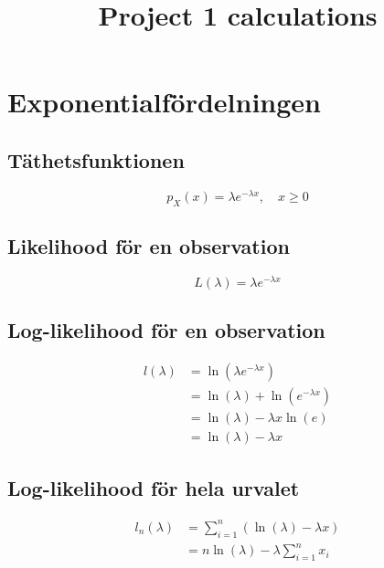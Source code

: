 \documentclass[
]{article}
\title{Project 1 calculations}
\author{}
\date{\vspace{-2.5em}}
\begin{document}
\maketitle

\hypertarget{exponentialfuxf6rdelningen}{%
\section{Exponentialfördelningen}\label{exponentialfuxf6rdelningen}}

\hypertarget{tuxe4thetsfunktionen}{%
\subsection{Täthetsfunktionen}\label{tuxe4thetsfunktionen}}

\[
p_X(x) = \lambda e^{-\lambda x}, \quad x \ge 0
\]

\hypertarget{likelihood-fuxf6r-en-observation}{%
\subsection{Likelihood för en
observation}\label{likelihood-fuxf6r-en-observation}}

\[
L(\lambda) = \lambda e^{-\lambda x}
\]

\hypertarget{log-likelihood-fuxf6r-en-observation}{%
\subsection{Log-likelihood för en
observation}\label{log-likelihood-fuxf6r-en-observation}}

\[
\begin{aligned}
l(\lambda) &= \ln(\lambda e^{-\lambda x}) \\
           &= \ln(\lambda) + \ln(e^{-\lambda x}) \\
           &= \ln(\lambda) - \lambda x \ln(e) \\
           &= \ln(\lambda) - \lambda x 
\end{aligned}
\]

\hypertarget{log-likelihood-fuxf6r-hela-urvalet}{%
\subsection{Log-likelihood för hela
urvalet}\label{log-likelihood-fuxf6r-hela-urvalet}}

\[
\begin{aligned}
l_n(\lambda) &= \sum_{i=1}^{n}(\ln(\lambda) - \lambda x) \\
             &= n\ln(\lambda) - \lambda\sum_{i=1}^{n}x_i
\end{aligned}
\]
\end{document}
